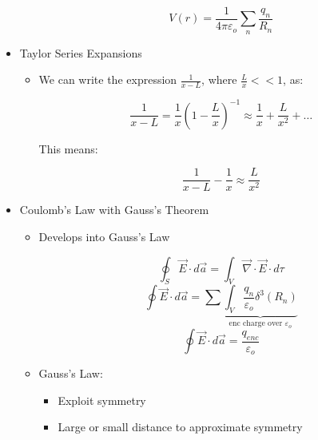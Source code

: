 \begin{itemize}
\begin{itemize}
        $$V(r)=\frac{1}{4\pi\varepsilon_o}\sum_n\frac{q_n}{R_n}$$

    \end{itemize}

  \item Taylor Series Expansions

    \begin{itemize}

      \item We can write the expression $\frac{1}{x-L}$, where $\frac{L}{x}<<1$, as:

        $$\frac{1}{x-L}=\frac{1}{x}\left( 1-\frac{L}{x} \right)^{-1}\approx\frac{1}{x}+\frac{L}{x^2}+\ldots$$

        This means:

        $$\frac{1}{x-L}-\frac{1}{x}\approx\frac{L}{x^2}$$

    \end{itemize}

  \item Coulomb's Law with Gauss's Theorem

    \begin{itemize}

      \item Develops into Gauss's Law


        $$\oint_S\vec{E}\cdot d\vec{a}=\int_V\vec{\nabla}\cdot\vec{E}\cdot d\tau$$
        $$\oint\vec{E}\cdot d\vec{a}=\sum\underbrace{\int_V \frac{q_n}{\varepsilon_o}\delta^3(R_n)}_{\text{enc charge over $\varepsilon_o$}}$$
        $$\oint\vec{E}\cdot d\vec{a}=\frac{q_{enc}}{\varepsilon_o}$$

      \item Gauss's Law:

        \begin{itemize}

          \item Exploit symmetry

          \item Large or small distance to approximate symmetry
            
        \end{itemize}

    \end{itemize}

\end{itemize}



